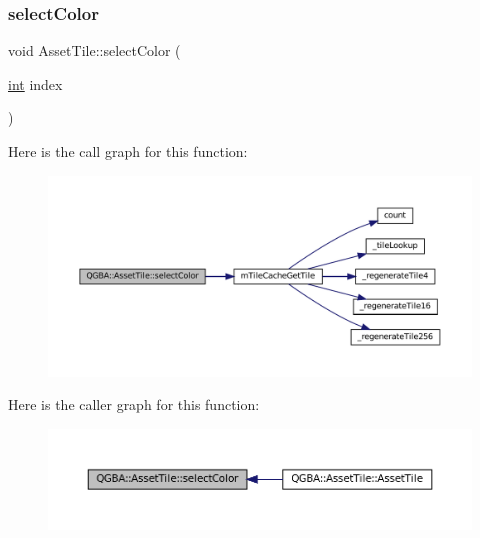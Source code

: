 \mbox{\label{class_q_g_b_a_1_1_asset_tile_af49cc943f4c92d78aa58bd33559a7618}} 
\subsubsection{\texorpdfstring{select\+Color}{selectColor}}
{\footnotesize\ttfamily void Asset\+Tile\+::select\+Color (\begin{DoxyParamCaption}\item[{\mbox{\hyperlink{ioapi_8h_a787fa3cf048117ba7123753c1e74fcd6}{int}}}]{index }\end{DoxyParamCaption})\hspace{0.3cm}{\ttfamily [slot]}}

Here is the call graph for this function\+:
\nopagebreak
\begin{figure}[H]
\begin{center}
\leavevmode
\includegraphics[width=350pt]{class_q_g_b_a_1_1_asset_tile_af49cc943f4c92d78aa58bd33559a7618_cgraph}
\end{center}
\end{figure}
Here is the caller graph for this function\+:
\nopagebreak
\begin{figure}[H]
\begin{center}
\leavevmode
\includegraphics[width=350pt]{class_q_g_b_a_1_1_asset_tile_af49cc943f4c92d78aa58bd33559a7618_icgraph}
\end{center}
\end{figure}
\mbox{\label{class_q_g_b_a_1_1_asset_tile_a737edc8b5a7ef139126277fb7a3a4400}} 
